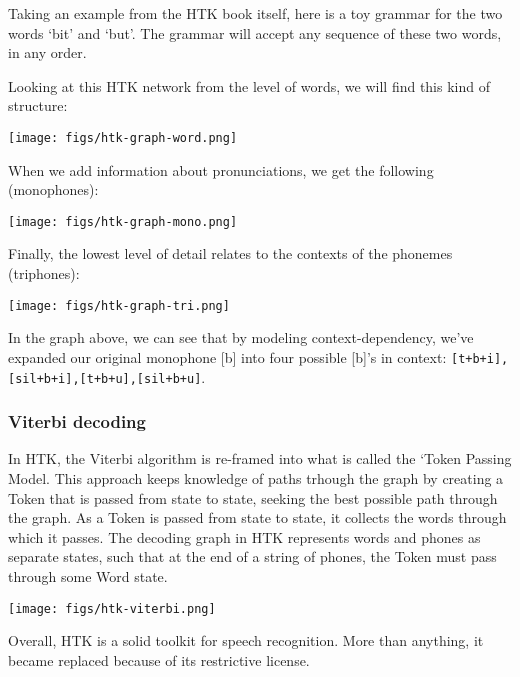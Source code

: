 \documentclass[10pt,a4paper]{article}
\begin{document}
Taking an example from the HTK book itself, here is a toy grammar for the two words `bit' and `but'. The grammar will accept any sequence of these two words, in any order.

Looking at this HTK network from the level of words, we will find this kind of structure:

\begin{center}
  \texttt{[image: figs/htk-graph-word.png]}
\end{center}

When we add information about pronunciations, we get the following (monophones):

\begin{center}
  \texttt{[image: figs/htk-graph-mono.png]}
\end{center}

Finally, the lowest level of detail relates to the contexts of the phonemes (triphones):

\begin{center}
  \texttt{[image: figs/htk-graph-tri.png]}
\end{center}

In the graph above, we can see that by modeling context-dependency, we've expanded our original monophone [b] into four possible [b]'s in context: \texttt{[t+b+i],[sil+b+i],[t+b+u],[sil+b+u]}.



\subsubsection*{Viterbi decoding} 

In HTK, the Viterbi algorithm is re-framed into what is called the `Token Passing Model. This approach keeps knowledge of paths trhough the graph by creating a Token that is passed from state to state, seeking the best possible path through the graph. As a Token is passed from state to state, it collects the words through which it passes. The decoding graph in HTK represents words and phones as separate states, such that at the end of a string of phones, the Token must pass through some Word state. 

    
\begin{center}
  \texttt{[image: figs/htk-viterbi.png]}
\end{center}


Overall, HTK is a solid toolkit for speech recognition. More than anything, it became replaced because of its restrictive license.
\end{document}
